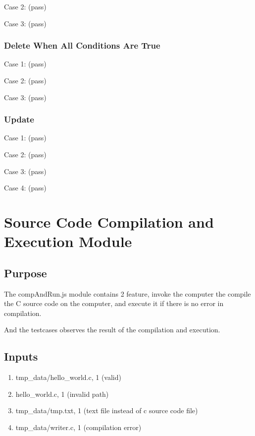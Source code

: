 Case 2: (pass)


Case 3: (pass)


\subsubsection{Delete When All Conditions Are True}
Case 1: (pass)


Case 2: (pass)


Case 3: (pass)


\subsubsection{Update}
Case 1: (pass)


Case 2: (pass)


Case 3: (pass)


Case 4: (pass)


\section{Source Code Compilation and Execution Module}
\subsection{Purpose}
The compAndRun.js module contains 2 feature, invoke the computer the compile the C source code on the computer, and execute it if there is no error in compilation.

And the testcases observes the result of the compilation and execution.

\subsection{Inputs}
\begin{enumerate}
  \item tmp\_data/hello\_world.c, 1 (valid)
  \item hello\_world.c, 1 (invalid path)
  \item tmp\_data/tmp.txt, 1 (text file instead of c source code file)
  \item tmp\_data/writer.c, 1 (compilation error)
\end{enumerate}

